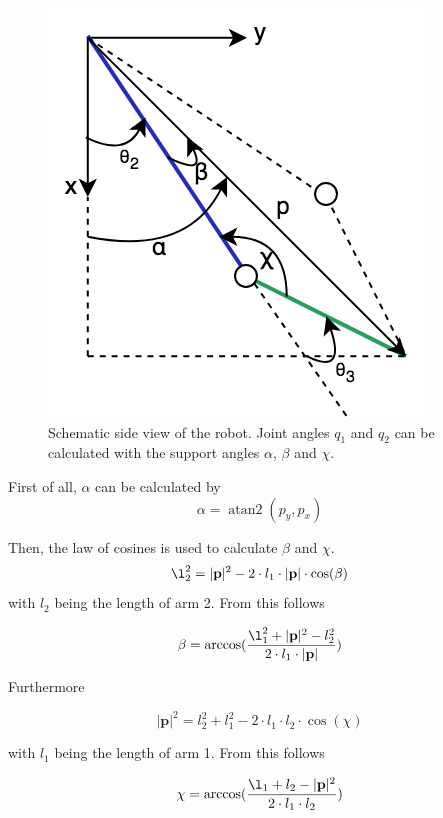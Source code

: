 \documentclass[conference]{IEEEtran}
\DeclareMathOperator{\atantwo}{atan2}
\begin{document}
\begin{figure}[htbp]
	\centerline{\includegraphics[scale=0.4]{img/kin_q1_q2.png}}
	\caption{Schematic side view of the robot. Joint angles $q_1$ and $q_2$ can be calculated with the support angles $\alpha$, $\beta$ and $\chi$.}
	\label{fig:q1_q2_calc}
\end{figure}

First of all, $\alpha$ can be calculated by
\begin{equation}
\alpha = \atantwo(p_y, p_x)
\end{equation}

Then, the law of cosines is used to calculate $\beta$ and $\chi$.
\begin{equation}
\l_2^2 = |\textbf{p}|^2 - 2 \cdot l_1 \cdot |\textbf{p}| \cdot \cos(\beta)
\end{equation}
with $l_2$ being the length of arm 2. From this follows

\begin{equation}
\beta = \arccos(\frac{\l_1^2 + |\textbf{p}|^2 - l_2^2}{2 \cdot l_1 \cdot |\textbf{p}|})
\end{equation}

Furthermore

\begin{equation}
|\textbf{p}|^2 = l_2^2 + l_1^2 - 2 \cdot l_1 \cdot l_2 \cdot \cos(\chi)
\end{equation}

with $l_1$ being the length of arm 1. From this follows

\begin{equation}
\chi = \arccos(\frac{\l_1 + l_2 - |\textbf{p}|^2}{2 \cdot l_1 \cdot l_2})
\end{equation}
\end{document}
